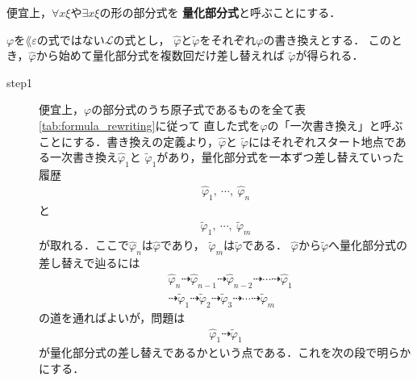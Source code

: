 	便宜上，$\forall x \xi$や$\exists x \xi$の形の部分式を
	{\bf 量化部分式}と呼ぶことにする．
	
	\begin{screen}
		\begin{metathm}[同じ式の別の書き換えには量化部分式の複数回の書き換えで辿り着ける]
		\label{metathm:formula_rewritings_coincide_except_the_differences_of_bound_variables}
			$\varphi$を$\lang{\varepsilon}$の式ではない$\mathcal{L}$の式とし，
			$\widehat{\varphi}$と$\widetilde{\varphi}$をそれぞれ$\varphi$の書き換えとする．
			このとき，$\widehat{\varphi}$から始めて量化部分式を複数回だけ差し替えれば
			$\widetilde{\varphi}$が得られる．
		\end{metathm}
	\end{screen}
	
	\begin{sketch}\mbox{}
		\begin{description}
			\item[step1]
				便宜上，$\varphi$の部分式のうち原子式であるものを全て表\ref{tab:formula_rewriting}に従って
				直した式を$\varphi$の「一次書き換え」と呼ぶことにする．書き換えの定義より，$\widehat{\varphi}$と
				$\widetilde{\varphi}$にはそれぞれスタート地点である一次書き換え$\widehat{\varphi}_{1}$と
				$\widetilde{\varphi}_{1}$があり，量化部分式を一本ずつ差し替えていった履歴
				\begin{align}
					\widehat{\varphi}_{1},\ \cdots,\ \widehat{\varphi}_{n}
				\end{align}
				と
				\begin{align}
					\widetilde{\varphi}_{1},\ \cdots,\ \widetilde{\varphi}_{m}
				\end{align}
				が取れる．ここで$\widehat{\varphi}_{n}$は$\widehat{\varphi}$であり，
				$\widetilde{\varphi}_{m}$は$\widetilde{\varphi}$である．
				$\widehat{\varphi}$から$\widetilde{\varphi}$へ量化部分式の差し替えで辿るには
				\begin{align}
					&\widehat{\varphi}_{n} \dashrightarrow \widehat{\varphi}_{n-1} 
					\dashrightarrow \widehat{\varphi}_{n-2} \dashrightarrow \cdots 
					\dashrightarrow \widehat{\varphi}_{1} \\
					&\dashrightarrow \widetilde{\varphi}_{1} 
					\dashrightarrow \widetilde{\varphi}_{2} 
					\dashrightarrow \widetilde{\varphi}_{3} 
					\dashrightarrow \cdots \dashrightarrow \widetilde{\varphi}_{m}
				\end{align}
				の道を通ればよいが，問題は
				\begin{align}
					\widehat{\varphi}_{1} \dashrightarrow \widetilde{\varphi}_{1}
				\end{align}
				が量化部分式の差し替えであるかという点である．これを次の段で明らかにする．
			

\end{description}
\end{sketch}

